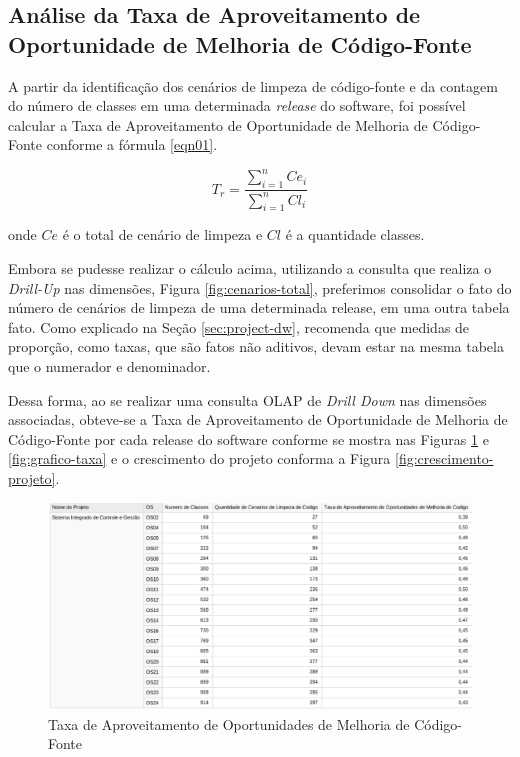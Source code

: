 \subsection{Análise da Taxa de Aproveitamento de Oportunidade de Melhoria de Código-Fonte}

A partir da identificação dos cenários de limpeza de código-fonte e da contagem do número de classes em uma determinada \textit{release} do software, foi possível calcular a Taxa de Aproveitamento de Oportunidade de Melhoria de Código-Fonte conforme a fórmula \ref{eqn01}.

\begin{equation}
\label{eqn01}
T_r =   \frac{{\sum_{i=1}^{n}{Ce_i}}}{\sum_{i=1}^{n}{Cl_i}}
\end{equation}

onde $ Ce $ é o total de cenário de limpeza e $ Cl $ é a quantidade classes.

 Embora se pudesse realizar o cálculo acima, utilizando a consulta que realiza o \textit{Drill-Up} nas dimensões, Figura \ref{fig:cenarios-total}, preferimos consolidar o fato do número de cenários de limpeza de uma determinada release, em uma outra tabela fato. Como explicado na Seção \ref{sec:project-dw},  recomenda que medidas de proporção, como taxas, que são fatos não aditivos, devam estar na mesma tabela que o numerador e denominador.

 Dessa forma, ao se realizar uma consulta OLAP de \textit{Drill Down} nas dimensões associadas, obteve-se a Taxa de Aproveitamento de Oportunidade de Melhoria de Código-Fonte por cada release do software conforme se mostra nas Figuras \ref{fig:taxa-cenarios} e \ref{fig:grafico-taxa} e o crescimento do projeto conforma a Figura \ref{fig:crescimento-projeto}. 


\begin{figure}[H]
\centering
\includegraphics[keepaspectratio=true,scale=0.48]{figuras/taxa-parcial.eps}
\caption{Taxa de Aproveitamento de Oportunidades de Melhoria de Código-Fonte}
\label{fig:taxa-cenarios}
\end{figure}
\FloatBarrier


